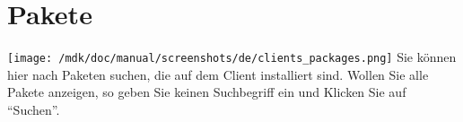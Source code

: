 \section*{Pakete}
\texttt{[image: /mdk/doc/manual/screenshots/de/clients\_packages.png]}
 Sie k\"onnen hier nach Paketen suchen, die auf dem Client installiert sind. Wollen Sie alle Pakete anzeigen, so geben Sie keinen Suchbegriff ein und Klicken Sie auf ``Suchen''. 

